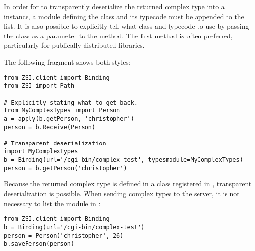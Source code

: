 In order for \ZSI{} to transparently deserialize the returned complex type into
a  instance, a module defining the class and its typecode must
be appended to the  list.
It is also possible to explicitly tell \ZSI{} what class and typecode to
use by passing the class as a parameter to the
 method.
The first method is often preferred, particularly for publically-distributed
libraries.

The following fragment shows both styles:

\begin{verbatim}
from ZSI.client import Binding
from ZSI import Path

# Explicitly stating what to get back.
from MyComplexTypes import Person
a = apply(b.getPerson, 'christopher')
person = b.Receive(Person)

# Transparent deserialization
import MyComplexTypes
b = Binding(url='/cgi-bin/complex-test', typesmodule=MyComplexTypes)
person = b.getPerson('christopher')
\end{verbatim}

Because the returned complex type is defined in a class registered in 
, transparent deserialization is possible.  When sending
complex types to the server, it is not necessary to list the module
in :

\begin{verbatim}
from ZSI.client import Binding
b = Binding(url='/cgi-bin/complex-test')
person = Person('christopher', 26)
b.savePerson(person)
\end{verbatim}
